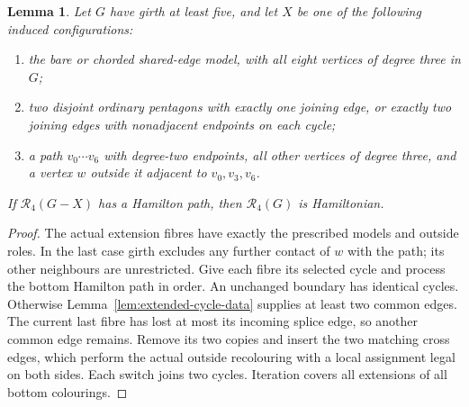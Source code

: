 \documentclass[11pt]{article}
\newtheorem{lemma}[theorem]{Lemma}
\theoremstyle{remark}
\newcommand{\R}{\mathcal R}
\numberwithin{equation}{section}
\numberwithin{table}{section}
\begin{document}
\begin{lemma}\label{lem:extended-cycle-restoration}
Let $G$ have girth at least five, and let $X$ be one of the following
induced configurations:
\begin{enumerate}
\item the bare or chorded shared-edge model, with all eight vertices
of degree three in $G$;
\item two disjoint ordinary pentagons with exactly one joining edge,
or exactly two joining edges with nonadjacent endpoints on each cycle;
\item a path $v_0\cdots v_6$ with degree-two endpoints, all other
vertices of degree three, and a vertex $w$ outside it adjacent to
$v_0,v_3,v_6$.
\end{enumerate}
If $\R_4(G-X)$ has a Hamilton path, then $\R_4(G)$ is Hamiltonian.
\end{lemma}
\begin{proof}
The actual extension fibres have exactly the prescribed models and
outside roles. In the last case girth excludes any further contact
of $w$ with the path; its other neighbours are unrestricted.
Give each fibre its selected cycle and process the bottom Hamilton
path in order. An unchanged boundary has identical cycles. Otherwise
Lemma~\ref{lem:extended-cycle-data} supplies at least two common edges.
The current last fibre has lost at most its incoming splice edge, so
another common edge remains. Remove its two copies and insert the two
matching cross edges, which perform the actual outside recolouring
with a local assignment legal on both sides. Each switch joins two
cycles. Iteration covers all extensions of all bottom colourings.
\end{proof}
\end{document}
